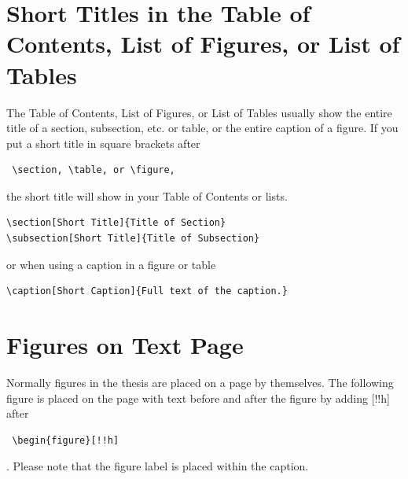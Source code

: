 \section[Short Titles]{Short Titles in the Table of Contents, List of Figures, or List of Tables}

The Table of Contents, List of Figures, or List of Tables usually show the entire title of a section, subsection, etc. or table, or the entire caption of a figure.  If you put a short title in square brackets after \begin{verbatim} \section, \table, or \figure, \end{verbatim} the short title will show in your Table of Contents or lists.

\renewcommand{\baselinestretch}{1}
\small\normalsize

\begin{verbatim}
\section[Short Title]{Title of Section}
\subsection[Short Title]{Title of Subsection}
\end{verbatim}

or when using a caption in a figure or table
\begin{verbatim}
\caption[Short Caption]{Full text of the caption.}
\end{verbatim}

\renewcommand{\baselinestretch}{2}
\small\normalsize

\section{Figures on Text Page}

Normally figures in the thesis are placed on a page by themselves.  The following figure is placed on the page with text before and after the figure by adding [!!h] after \begin{verbatim} \begin{figure}[!!h] \end{verbatim}.  Please note that the figure label is placed within the caption.

\renewcommand{\baselinestretch}{1}
\large\normalsize

